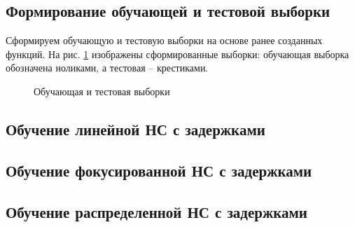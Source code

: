 \subsection{Формирование обучающей и тестовой выборки}


Сформируем обучающую и тестовую выборки на основе ранее созданных функций. На рис. \ref{fig:4_1} изображены сформированные выборки: обучающая выборка обозначена ноликами, а тестовая -- крестиками.
\begin{figure}[H]
\begin{center}
	\caption{Обучающая и тестовая выборки}
	\label{fig:4_1}
\end{center}
\end{figure}

\subsection{Обучение линейной НС с задержками}


\subsection{Обучение фокусированной НС с задержками}


\subsection{Обучение распределенной НС с задержками}

